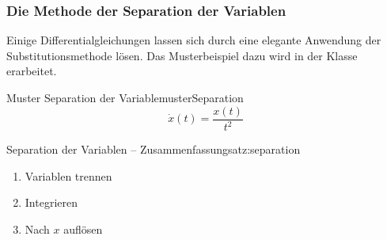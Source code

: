 \clearpage


\subsubsection{Die Methode der Separation der Variablen}

Einige Differentialgleichungen lassen sich durch eine elegante
Anwendung der Substitutionsmethode lösen.
Das Musterbeispiel dazu wird in der Klasse erarbeitet.

\begin{bsp}
    {Muster Separation der Variable}{musterSeparation}
    \[\dot{x}(t) = \frac{x(t)}{t^2} \]
    \pagebreak
\end{bsp}

\begin{satz}{Separation der Variablen -- Zusammenfassung}{satz:separation}
    \begin{enumerate}
        \item Variablen trennen
        \item Integrieren
        \item Nach \(x\) auflösen
    \end{enumerate}
\end{satz}
\clearpage
